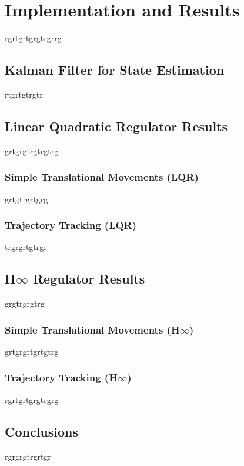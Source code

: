 \chapter{Implementation and Results} \label{ch:implementation}
rgrtgrtgrgtrgrrg
\section{Kalman Filter for State Estimation}
rtgrtgtrgtr
\section{Linear Quadratic Regulator Results}
grtgrgtrgtrgtrg

\subsection{Simple Translational Movements (LQR)}
grtgtrgrtgrg
\subsection{Trajectory Tracking (LQR)}
trgrgrtgtrgr

\section{H$\infty$ Regulator Results}
grgtrgrgtrg

\subsection{Simple Translational Movements (H$\infty$)}
grtgrgrtgrtgtrg

\subsection{Trajectory Tracking (H$\infty$)}
rgrtgrtgrgtrgrg
\section{Conclusions}
rgrgrgtrgrtgr
